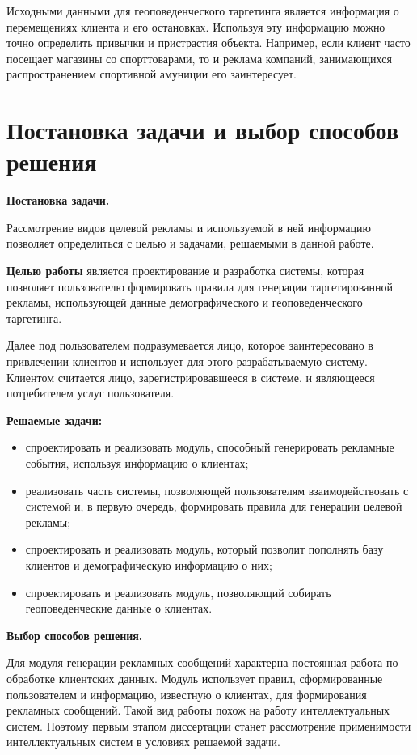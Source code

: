 Исходными данными для геоповеденческого таргетинга является информация о перемещениях клиента и его остановках. Используя эту информацию можно точно определить привычки и пристрастия объекта. Например, если клиент часто посещает магазины со спорттоварами, то и реклама компаний, занимающихся распространением спортивной амуниции его заинтересует.

\section{Постановка задачи и выбор способов решения}

\textbf{Постановка задачи.}

Рассмотрение видов целевой рекламы и используемой в ней информацию позволяет определиться с целью и задачами, решаемыми в данной работе.

\textbf{Целью работы} является проектирование и разработка системы, которая позволяет пользователю формировать правила для генерации таргетированной рекламы,  использующей данные демографического и геоповеденческого таргетинга. 

Далее под пользователем подразумевается лицо, которое заинтересовано в привлечении клиентов и использует для этого разрабатываемую систему. Клиентом считается лицо, зарегистрировавшееся в системе, и являющееся потребителем услуг пользователя. 

\textbf{Решаемые задачи:}

\begin{itemize}
	\item спроектировать и реализовать модуль, способный генерировать рекламные события, используя информацию о клиентах;
	\item реализовать часть системы, позволяющей пользователям взаимодействовать с системой и, в первую очередь, формировать правила для генерации целевой рекламы;
	\item спроектировать и реализовать модуль, который позволит пополнять базу клиентов и демографическую информацию о них;
	\item спроектировать и реализовать модуль, позволяющий собирать геоповеденческие данные о клиентах.
\end{itemize}

\textbf{Выбор способов решения.}

Для модуля генерации рекламных сообщений характерна постоянная работа по обработке клиентских данных. Модуль использует правил, сформированные пользователем и информацию, известную о клиентах, для формирования рекламных сообщений. Такой вид работы похож на работу интеллектуальных систем. Поэтому первым этапом диссертации станет рассмотрение применимости интеллектуальных систем в условиях решаемой задачи.

